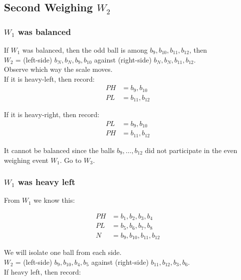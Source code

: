 \documentclass[12pt]{article}
\begin{document}
\subsection*{Second Weighing $W_2$}

\subsubsection*{$W_1$ was balanced}

If $W_1$ was balanced, then the odd ball is among ${b_9, b_{10}, b_{11}, b_{12}}$, then\\

$W_2$ = (left-side) ${b_N, b_N, b_9, b_{10}}$ against (right-side) ${b_N, b_N, b_{11}, b_{12}}$.\\

Observe which way the scale moves.\\

If it is heavy-left, then record:
\begin{align*}
PH &= {b_9, b_{10}}\\
PL &= {b_{11}, b_{12}}
\end{align*}

If it is heavy-right, then record:
\begin{align*}
PL &= {b_9, b_{10}}\\
PH &= {b_{11}, b_{12}}
\end{align*}

It cannot be balanced since the balls ${b_9, \ldots, b_{12}}$ did not participate in the even weighing event $W_1$.  Go to ${W_3}$.


\subsubsection*{$W_1$ was heavy left}

From $W_1$ we know this:

\begin{align*}
PH &= {b_1, b_2, b_3, b_4}\\
PL &= {b_5, b_6, b_7, b_8}\\
N  &= {b_9, b_{10}, b_{11}, b_{12}}
\end{align*}

We will isolate one ball from each side.\\

$W_2$ = (left-side) ${b_9, b_{10}, b_4, b_5}$ against (right-side) ${b_{11}, b_{12}, b_3, b_6}$.\\

If heavy left, then record:
\end{document}
